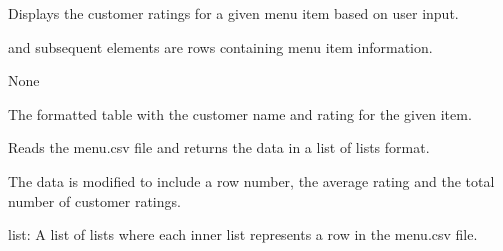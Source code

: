 \documentclass[letterpaper,10pt,english]{sphinxmanual}
\begin{document}

\begin{fulllineitems}
\label{\detokenize{main:main.get_customers_ratings}}
\pysigstartsignatures
{}
\pysigstopsignatures
\sphinxAtStartPar
Displays the customer ratings for a given menu item based on user input.
\begin{description}
\begin{description}
\sphinxAtStartPar
and subsequent elements are rows containing menu item information.

\end{description}

\sphinxAtStartPar
None

\sphinxAtStartPar
The formatted table with the customer name and rating for the given item.

\end{description}

\end{fulllineitems}


\begin{fulllineitems}
\label{\detokenize{main:main.get_data}}
\pysigstartsignatures
{}
\pysigstopsignatures
\sphinxAtStartPar
Reads the menu.csv file and returns the data in a list of lists format.

\sphinxAtStartPar
The data is modified to include a row number, the average rating and the total number of customer ratings.
\begin{description}
\sphinxAtStartPar
list: A list of lists where each inner list represents a row in the menu.csv file.

\end{description}

\end{fulllineitems}

\end{document}
